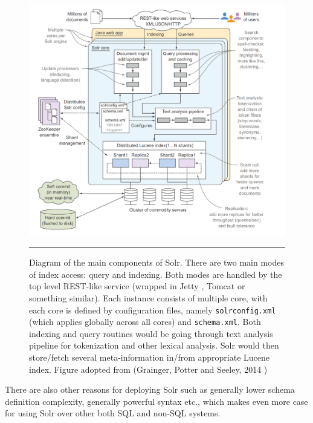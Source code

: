 \begin{figure}[htbp]
    \includegraphics[width=6in]{Figures/solr_components.png}
    \rule{35em}{0.5pt}
  \caption[Diagram of the main components of Solr.]{Diagram of the main components of Solr. There are two main modes of index access: query and indexing. Both modes are handled by the top level REST-like service (wrapped in Jetty \citep{jetty}, Tomcat \citep{apachetomcat} or something similar). Each instance consists of multiple core, with each core is defined by configuration files, namely \texttt{solrconfig.xml} (which applies globally across all cores) and \texttt{schema.xml}. Both indexing and query routines would be going through text analysis pipeline for tokenization and other lexical analysis. Solr would then store/fetch several meta-information in/from appropriate Lucene index. Figure adopted from (Grainger, Potter and Seeley, 2014 \citep{grainger2014solr})}
  \label{fig:SolrComponents}
\end{figure}


There are also other reasons for deploying Solr such as generally lower schema definition complexity, generally powerful syntax etc., which makes even more case for using Solr over other both SQL and non-SQL systems.


